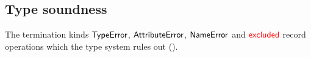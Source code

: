 \subsection{Type soundness}
\label{sec:type-soundness}

The termination kinds $\mathsf{TypeError}$, $\mathsf{AttributeError}$, $\mathsf{NameError}$ and $\textcolor{red}{\mathsf{excluded}}$ record operations which the type system
rules out ().

